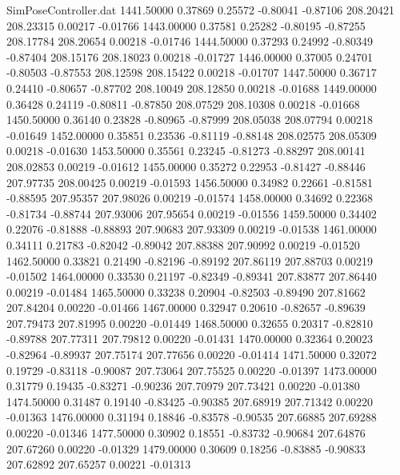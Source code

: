 \begin{filecontents}{SimPoseController.dat}
1441.50000    0.37869    0.25572    -0.80041   -0.87106  208.20421  208.23315    0.00217   -0.01766
1443.00000    0.37581    0.25282    -0.80195   -0.87255  208.17784  208.20654    0.00218   -0.01746
1444.50000    0.37293    0.24992    -0.80349   -0.87404  208.15176  208.18023    0.00218   -0.01727
1446.00000    0.37005    0.24701    -0.80503   -0.87553  208.12598  208.15422    0.00218   -0.01707
1447.50000    0.36717    0.24410    -0.80657   -0.87702  208.10049  208.12850    0.00218   -0.01688
1449.00000    0.36428    0.24119    -0.80811   -0.87850  208.07529  208.10308    0.00218   -0.01668
1450.50000    0.36140    0.23828    -0.80965   -0.87999  208.05038  208.07794    0.00218   -0.01649
1452.00000    0.35851    0.23536    -0.81119   -0.88148  208.02575  208.05309    0.00218   -0.01630
1453.50000    0.35561    0.23245    -0.81273   -0.88297  208.00141  208.02853    0.00219   -0.01612
1455.00000    0.35272    0.22953    -0.81427   -0.88446  207.97735  208.00425    0.00219   -0.01593
1456.50000    0.34982    0.22661    -0.81581   -0.88595  207.95357  207.98026    0.00219   -0.01574
1458.00000    0.34692    0.22368    -0.81734   -0.88744  207.93006  207.95654    0.00219   -0.01556
1459.50000    0.34402    0.22076    -0.81888   -0.88893  207.90683  207.93309    0.00219   -0.01538
1461.00000    0.34111    0.21783    -0.82042   -0.89042  207.88388  207.90992    0.00219   -0.01520
1462.50000    0.33821    0.21490    -0.82196   -0.89192  207.86119  207.88703    0.00219   -0.01502
1464.00000    0.33530    0.21197    -0.82349   -0.89341  207.83877  207.86440    0.00219   -0.01484
1465.50000    0.33238    0.20904    -0.82503   -0.89490  207.81662  207.84204    0.00220   -0.01466
1467.00000    0.32947    0.20610    -0.82657   -0.89639  207.79473  207.81995    0.00220   -0.01449
1468.50000    0.32655    0.20317    -0.82810   -0.89788  207.77311  207.79812    0.00220   -0.01431
1470.00000    0.32364    0.20023    -0.82964   -0.89937  207.75174  207.77656    0.00220   -0.01414
1471.50000    0.32072    0.19729    -0.83118   -0.90087  207.73064  207.75525    0.00220   -0.01397
1473.00000    0.31779    0.19435    -0.83271   -0.90236  207.70979  207.73421    0.00220   -0.01380
1474.50000    0.31487    0.19140    -0.83425   -0.90385  207.68919  207.71342    0.00220   -0.01363
1476.00000    0.31194    0.18846    -0.83578   -0.90535  207.66885  207.69288    0.00220   -0.01346
1477.50000    0.30902    0.18551    -0.83732   -0.90684  207.64876  207.67260    0.00220   -0.01329
1479.00000    0.30609    0.18256    -0.83885   -0.90833  207.62892  207.65257    0.00221   -0.01313

\end{filecontents}
